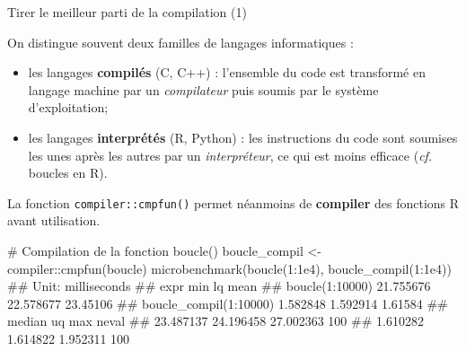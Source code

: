\documentclass[12pt,ignorenonframetext,]{beamer}
\newenvironment{Shaded}{}{}
\newcommand{\CommentTok}[1]{\textcolor[rgb]{0.00,0.50,0.00}{#1}}
\newcommand{\DecValTok}[1]{#1}
\newcommand{\FloatTok}[1]{#1}
\newcommand{\KeywordTok}[1]{\textcolor[rgb]{0.00,0.00,1.00}{#1}}
\newcommand{\NormalTok}[1]{#1}
\newcommand{\OperatorTok}[1]{#1}
\newcommand{\StringTok}[1]{\textcolor[rgb]{0.00,0.50,0.50}{#1}}
\providecommand{\tightlist}{%
  \setlength{\itemsep}{0pt}\setlength{\parskip}{0pt}}
\renewenvironment{Shaded}{\begin{snugshade}}{\end{snugshade}}
\begin{document}
\begin{frame}[fragile]{Tirer le meilleur parti de la compilation (1)}
\protect\hypertarget{tirer-le-meilleur-parti-de-la-compilation-1}{}

On distingue souvent deux familles de langages informatiques :

\begin{itemize}
\tightlist
\item
  \pause \vspace{-0.2cm} les langages \textbf{compilés} (C, C++) :
  l’ensemble du code est transformé en langage machine par un
  \emph{compilateur} puis soumis par le système d’exploitation;
\item
  \pause les langages \textbf{interprétés} (R, Python) : les
  instructions du code sont soumises les unes après les autres par un
  \emph{interpréteur}, ce qui est moins efficace (\emph{cf.} boucles en
  R).
\end{itemize}

\vspace{0.1cm}

\pause La fonction \texttt{compiler::cmpfun()} permet néanmoins de
\textbf{compiler} des fonctions R avant utilisation.

\pause \footnotesize \vspace{-0.2cm}

\begin{Shaded}
\begin{Highlighting}[]
\CommentTok{# Compilation de la fonction boucle()}
\NormalTok{boucle_compil <-}\StringTok{ }\NormalTok{compiler}\OperatorTok{::}\KeywordTok{cmpfun}\NormalTok{(boucle)}
\KeywordTok{microbenchmark}\NormalTok{(}\KeywordTok{boucle}\NormalTok{(}\DecValTok{1}\OperatorTok{:}\FloatTok{1e4}\NormalTok{), }\KeywordTok{boucle_compil}\NormalTok{(}\DecValTok{1}\OperatorTok{:}\FloatTok{1e4}\NormalTok{))}
\NormalTok{  ## Unit: milliseconds}
\NormalTok{  ##                    expr       min        lq     mean}
\NormalTok{  ##         boucle(1:10000) 21.755676 22.578677 23.45106}
\NormalTok{  ##  boucle_compil(1:10000)  1.582848  1.592914  1.61584}
\NormalTok{  ##     median        uq       max neval}
\NormalTok{  ##  23.487137 24.196458 27.002363   100}
\NormalTok{  ##   1.610282  1.614822  1.952311   100}
\end{Highlighting}
\end{Shaded}

\end{frame}
\end{document}
